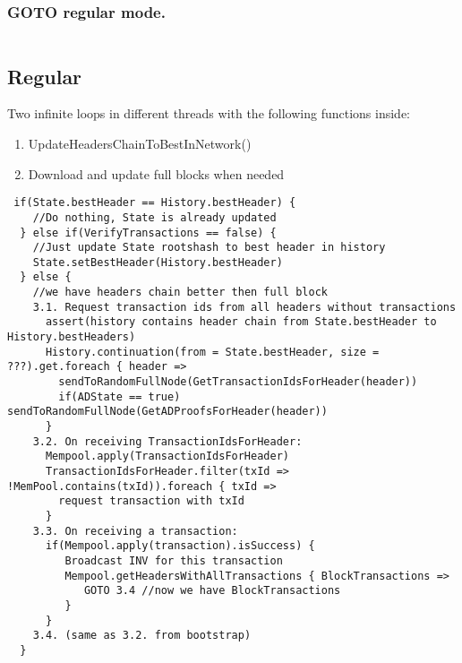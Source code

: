 \documentclass[]{article}   %
\begin{document}
\subsubsection{GOTO regular mode.}
\begin{verbatim}

\end{verbatim}
\subsection{Regular}
Two infinite loops in different threads with the following functions inside:
\begin{enumerate}
\item UpdateHeadersChainToBestInNetwork()
\item Download and update full blocks when needed
\end{enumerate}
\begin{verbatim}
 if(State.bestHeader == History.bestHeader) {
    //Do nothing, State is already updated
  } else if(VerifyTransactions == false) {
    //Just update State rootshash to best header in history
    State.setBestHeader(History.bestHeader)
  } else {
    //we have headers chain better then full block         
    3.1. Request transaction ids from all headers without transactions
      assert(history contains header chain from State.bestHeader to History.bestHeaders)
      History.continuation(from = State.bestHeader, size = ???).get.foreach { header => 
        sendToRandomFullNode(GetTransactionIdsForHeader(header))
        if(ADState == true) sendToRandomFullNode(GetADProofsForHeader(header))
      }
    3.2. On receiving TransactionIdsForHeader:
      Mempool.apply(TransactionIdsForHeader)
      TransactionIdsForHeader.filter(txId => !MemPool.contains(txId)).foreach { txId => 
        request transaction with txId
      }
    3.3. On receiving a transaction:
      if(Mempool.apply(transaction).isSuccess) {
         Broadcast INV for this transaction
         Mempool.getHeadersWithAllTransactions { BlockTransactions =>
            GOTO 3.4 //now we have BlockTransactions
         }
      }
    3.4. (same as 3.2. from bootstrap)
  }
\end{verbatim}
\end{document}
